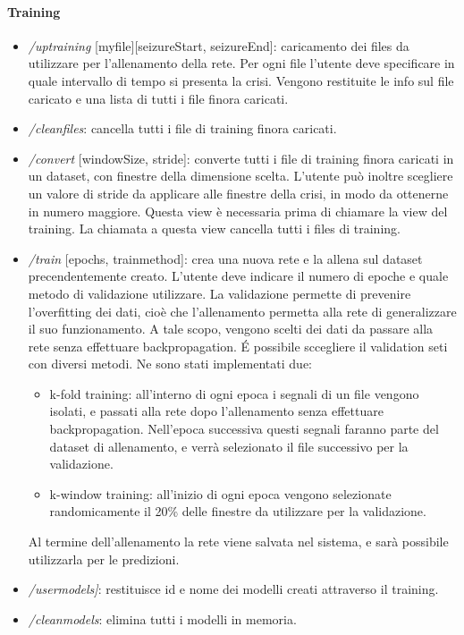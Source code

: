\documentclass{article}
\begin{document}
\paragraph{Training}
\begin{itemize}
\item \textit{/uptraining} [myfile][seizureStart, seizureEnd]: caricamento dei files da utilizzare per l'allenamento della rete. Per ogni file l'utente deve specificare in quale intervallo di tempo si presenta la crisi. Vengono restituite le info sul file caricato e una lista di tutti i file finora caricati.
\item \textit{/cleanfiles}: cancella tutti i file di training finora caricati. 
\item \textit{/convert} [windowSize, stride]: converte tutti i file di training finora caricati in un dataset, con finestre della dimensione scelta. L'utente può inoltre scegliere un valore di stride da applicare alle finestre della crisi, in modo da ottenerne in numero maggiore. Questa view è necessaria prima di chiamare la view del training. La chiamata a questa view cancella tutti i files di training. 
\item \textit{/train} [epochs, train\textunderscore method]: crea una nuova rete e la allena sul dataset precendentemente creato. L'utente deve indicare il numero di epoche e quale metodo di validazione utilizzare. La validazione permette di prevenire l'overfitting dei dati, cioè che l'allenamento permetta alla rete di generalizzare il suo funzionamento. A tale scopo, vengono scelti dei dati da passare alla rete senza effettuare backpropagation. \'E possibile sccegliere il validation seti con diversi metodi. Ne sono stati implementati due:
\begin{itemize}
	\item k-fold training: all'interno di ogni epoca i segnali di un file vengono isolati, e passati alla rete dopo l'allenamento senza 	effettuare backpropagation. Nell'epoca successiva questi segnali faranno parte del dataset di allenamento, e verrà selezionato il file successivo per la validazione.
	\item k-window training: all'inizio di ogni epoca vengono selezionate randomicamente il 20\% delle finestre da utilizzare per la validazione.
\end{itemize}
Al termine dell'allenamento la rete viene salvata nel sistema, e sarà possibile utilizzarla per le predizioni. 
\item \textit{/usermodels]}: restituisce id e nome dei modelli creati attraverso il training. 
\item \textit{/cleanmodels}: elimina tutti i modelli in memoria. 
\end{itemize}
\end{document}
